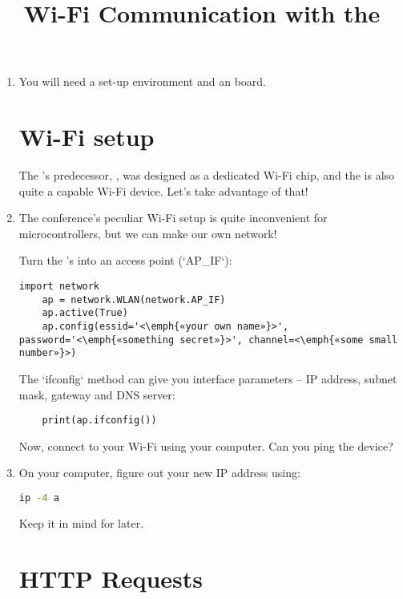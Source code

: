 \documentclass{../tutorial}
\title{Wi-Fi Communication with the \abbr{ESP32}}
\begin{document}
\begin{enumerate}

\item
    You will need a set-up environment and an  board.

\section{Wi-Fi setup}

    The 's predecessor, , was designed as a dedicated
    Wi-Fi chip,
    and the  is also quite a capable Wi-Fi device.
    Let's take advantage of that!


\item
    The conference's peculiar Wi-Fi setup is quite inconvenient for
    microcontrollers, but we can make our own network!

    Turn the 's into an access point (`AP_IF`):

    \begin{lstlisting}[escapeinside=<>]
    import network
    ap = network.WLAN(network.AP_IF)
    ap.active(True)
    ap.config(essid='<\emph{«your own name»}>', password='<\emph{«something secret»}>', channel=<\emph{«some small number»}>)
    \end{lstlisting}

    \begin{comment}
        Ideally, run `nmcli d wifi` on your Linux computer to see occupied
        Wi-Fi channels, and pick one you don't see.
    \end{comment}

    The `ifconfig` method can give you interface parameters – IP address,
    subnet mask, gateway and DNS server:

    \begin{lstlisting}
    print(ap.ifconfig())
    \end{lstlisting}

    Now, connect to your Wi-Fi using your computer.
    Can you ping the device?

\item
    On your computer, figure out your new IP address using:

    \begin{lstlisting}[language=bash]
    ip -4 a
    \end{lstlisting}

    Keep it in mind for later.

\section{HTTP Requests}


\end{enumerate}
\end{document}
